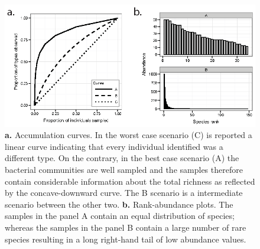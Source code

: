 \begin{figure}[!tb]
	\centering
	\includegraphics[width=\textwidth]{./figures/Introduction/rank_accumul1}
  	\caption{\textbf{a.} Accumulation curves. In the worst case scenario (C) is reported a linear curve indicating that every individual identified was a different type. On the contrary, in the best case scenario (A) the bacterial communities are well sampled and the samples therefore contain considerable information about the total richness as reflected by the concave-downward curve. The B scenario is a intermediate scenario between the other two. \textbf{b.} Rank-abundance plots. The samples in the panel A contain an equal distribution of species; whereas the samples in the panel B contain a large number of rare species resulting in a long right-hand tail of low abundance values.\label{fig:accrank}}
\end{figure}%


